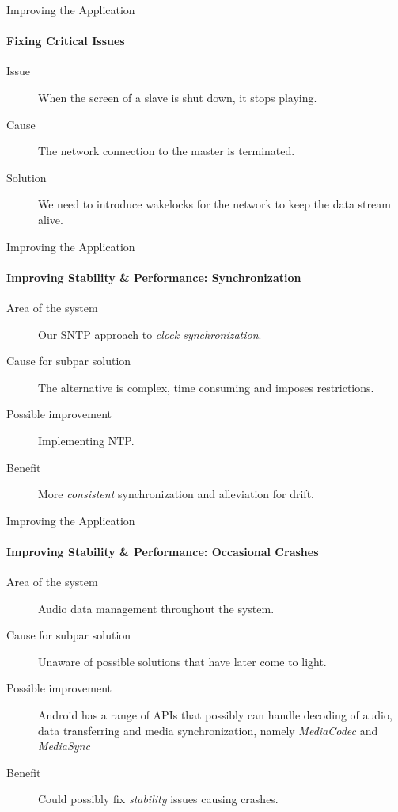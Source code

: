 \begin{frame}{Improving the Application}
    \framesubtitle{Fixing Critical Issues}
    \begin{description}
        \item [Issue] When the screen of a slave is shut down, it stops playing.
        \item [Cause] The network connection to the master is terminated.
        \item [Solution] We need to introduce wakelocks for the network to keep the data stream alive.
    \end{description}
\end{frame}

\begin{frame}{Improving the Application}
    \framesubtitle{Improving Stability \& Performance: Synchronization}
    \begin{description}
        \item [Area of the system] Our SNTP approach to \textit{clock synchronization}.
        \item [Cause for subpar solution] The alternative is complex, time consuming and imposes restrictions.
        \item [Possible improvement] Implementing NTP.
        \item [Benefit] More \textit{consistent} synchronization and alleviation for drift.
    \end{description}
\end{frame}

\begin{frame}{Improving the Application}
    \framesubtitle{Improving Stability \& Performance: Occasional Crashes}
    \begin{description}
        \item [Area of the system] Audio data management throughout the system.
        \item [Cause for subpar solution] Unaware of possible solutions that have later come to light.
        \item [Possible improvement] Android has a range of APIs that possibly can handle decoding of audio, data transferring and media synchronization, namely \textit{MediaCodec} and \textit{MediaSync}
        \item [Benefit] Could possibly fix \textit{stability} issues causing crashes.
    \end{description}
\end{frame}

